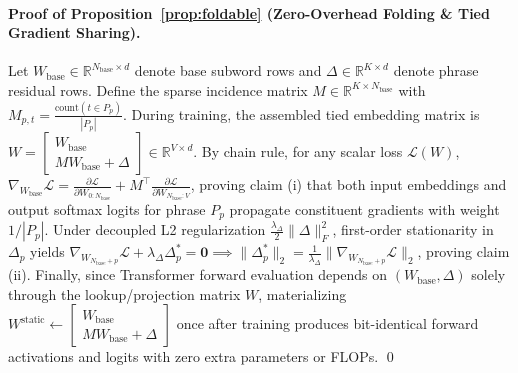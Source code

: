 \documentclass[11pt,a4paper]{article}
\begin{document}
\paragraph{Proof of Proposition~\ref{prop:foldable} (Zero-Overhead Folding \& Tied Gradient Sharing).}
Let $W_{\text{base}} \in \mathbb{R}^{N_{\text{base}} \times d}$ denote base subword rows and $\Delta \in \mathbb{R}^{K \times d}$ denote phrase residual rows. Define the sparse incidence matrix $M \in \mathbb{R}^{K \times N_{\text{base}}}$ with $M_{p, t} = \frac{\text{count}(t \in P_p)}{|P_p|}$. During training, the assembled tied embedding matrix is $W = \begin{bmatrix} W_{\text{base}} \\ M W_{\text{base}} + \Delta \end{bmatrix} \in \mathbb{R}^{V \times d}$. By chain rule, for any scalar loss $\mathcal{L}(W)$, $\nabla_{W_{\text{base}}} \mathcal{L} = \frac{\partial \mathcal{L}}{\partial W_{0:N_{\text{base}}}} + M^\top \frac{\partial \mathcal{L}}{\partial W_{N_{\text{base}}:V}}$, proving claim (i) that both input embeddings and output softmax logits for phrase $P_p$ propagate constituent gradients with weight $1/|P_p|$. Under decoupled L2 regularization $\frac{\lambda_\Delta}{2}\|\Delta\|_F^2$, first-order stationarity in $\Delta_p$ yields $\nabla_{W_{N_{\text{base}}+p}}\mathcal{L} + \lambda_\Delta \Delta_p^* = \mathbf{0} \implies \|\Delta_p^*\|_2 = \frac{1}{\lambda_\Delta}\|\nabla_{W_{N_{\text{base}}+p}}\mathcal{L}\|_2$, proving claim (ii). Finally, since Transformer forward evaluation depends on $(W_{\text{base}}, \Delta)$ solely through the lookup/projection matrix $W$, materializing $W^{\text{static}} \leftarrow \begin{bmatrix} W_{\text{base}} \\ M W_{\text{base}} + \Delta \end{bmatrix}$ once after training produces bit-identical forward activations and logits with zero extra parameters or FLOPs. \qed
\end{document}
